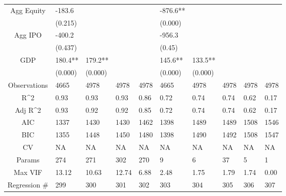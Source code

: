 \documentclass{article}
\begin{document}
\begin{table}[H]
\begin{tabular}{|clllllllll|}
  Agg Equity & -183.6 &  &  &  & -876.6** &  &  &  &  \\ 
   & (0.215) &  &  &  & (0.000) &  &  &  &  \\ 
  Agg IPO & -400.2 &  &  &  & -956.3 &  &  &  &  \\ 
   & (0.437) &  &  &  & (0.45) &  &  &  &  \\ 
  GDP & 180.4** & 179.2** &  &  & 145.6** & 133.5** &  &  &  \\ 
   & (0.000) & (0.000) &  &  & (0.000) & (0.000) &  &  &  \\ 
  \hline 
 Observations & 4665 & 4978 & 4978 & 4978 & 4665 & 4978 & 4978 & 4978 & 4978 \\ 
  R^2 & 0.93 & 0.93 & 0.93 & 0.86 & 0.72 & 0.74 & 0.74 & 0.62 & 0.17 \\ 
  Adj R^2 & 0.93 & 0.92 & 0.92 & 0.85 & 0.72 & 0.74 & 0.74 & 0.62 & 0.17 \\ 
  AIC & 1337 & 1430 & 1430 & 1462 & 1398 & 1489 & 1489 & 1508 & 1546 \\ 
  BIC & 1355 & 1448 & 1450 & 1480 & 1398 & 1490 & 1492 & 1508 & 1547 \\ 
  CV & NA & NA & NA & NA & NA & NA & NA & NA & NA \\ 
  Params & 274 & 271 & 302 & 270 & 9 & 6 & 37 & 5 & 1 \\ 
  Max VIF & 13.12 & 10.63 & 12.74 & 6.88 & 2.48 & 1.75 & 1.79 & 1.74 & 0.00 \\ 
  Regression \# & 299 & 300 & 301 & 302 & 303 & 304 & 305 & 306 & 307 \\ 
   \hline
\end{tabular}
 
\end{table}
\end{document}
